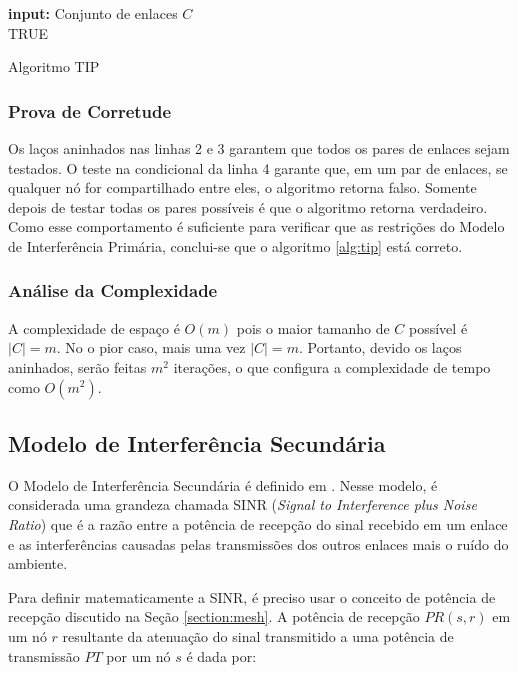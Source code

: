 \begin{algorithm}[h]
	\SetVline
	{\bf input:} Conjunto de enlaces $C$\\
	\Return TRUE
\caption{Algoritmo TIP}
\label{alg:tip}
\end{algorithm}

\subsubsection{Prova de Corretude}

Os laços aninhados nas linhas 2 e 3 garantem que todos os pares de enlaces sejam testados. O teste na condicional da linha 4 garante que, em um par de enlaces, se qualquer nó for compartilhado entre eles, o algoritmo retorna falso. Somente depois de testar todas os pares possíveis é que o algoritmo retorna verdadeiro. Como esse comportamento é suficiente para verificar que as restrições do Modelo de Interferência Primária, conclui-se que o algoritmo \ref{alg:tip} está correto.

\subsubsection{Análise da Complexidade}

A complexidade de espaço é $O(m)$ pois o maior tamanho de $C$ possível é $|C|=m$. No o pior caso, mais uma vez $|C|=m$. Portanto, devido os laços aninhados, serão feitas $m^2$ iterações, o que configura a complexidade de tempo como $O(m^2)$. 

\subsection{Modelo de Interferência Secundária}

O Modelo de Interferência Secundária é definido em \cite{sinr, models}. Nesse modelo, é considerada uma grandeza chamada SINR ({\it Signal to Interference plus Noise Ratio})  que é a razão entre a potência de recepção do sinal recebido em um enlace e as interferências causadas pelas transmissões dos outros enlaces mais o ruído do ambiente.

Para definir matematicamente a SINR, é preciso usar o conceito de potência de recepção discutido na Seção \ref{section:mesh}. A potência de recepção $PR(s,r)$  em um nó $r$ resultante da atenuação do sinal transmitido a uma potência de transmissão $PT$ por um nó $s$ é dada por:

